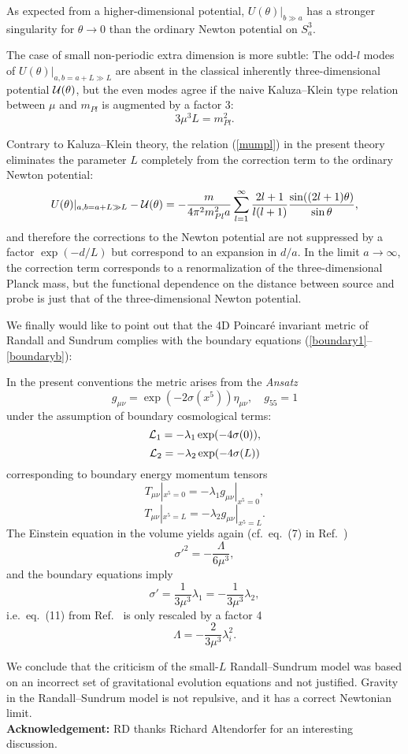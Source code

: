 \documentclass[12pt,fleqn]{article}
\newcommand{\be}{\begin{equation}}
\newcommand{\ee}{\end{equation}}
\begin{document}
As expected from a higher-dimensional potential,  
 $U(\theta)|_{b\gg a}$ has a stronger singularity for $\theta\to 0$ 
than the ordinary Newton potential on $S^3_a$. 

The case of small non-periodic extra dimension is more subtle: 
The odd-$l$ modes of $U(\theta)|_{a,b=a+L\gg L}$ are absent 
in the classical inherently three-dimensional 
potential  ${\cal U}(\theta)$, but the even modes agree 
if the naive Kaluza--Klein type relation between $\mu$
and $m_{Pl}$ is augmented by a factor 3: 
\be\label{mumpl} 
3\mu^3 L=m_{Pl}^2.
\ee

Contrary to Kaluza--Klein theory, the relation (\ref{mumpl}) 
in the present theory
eliminates the parameter $L$ completely from the correction 
term to the ordinary Newton potential:
\be\label{correct}
U(\theta)|_{a,b=a+L\gg L}-{\cal U}(\theta)
=
-\frac{m}{4\pi^2 m_{Pl}^2a}\sum_{l=1}^\infty
\frac{2l+1}{l(l+1)}\frac{\sin((2l+1)\theta)}{\sin\theta},
\ee
and therefore the corrections to the Newton potential are not suppressed
by a factor $\exp(-d/L)$ but correspond to an expansion in $d/a$.
In the limit $a\to\infty$, the correction term
corresponds to a renormalization of the
three-dimensional Planck mass, but the functional dependence
on the distance between source and probe
is just that of the three-dimensional Newton potential.

We finally would like to point out that the 4D Poincar\'{e} invariant
 metric of Randall and Sundrum \cite{RS1} complies with the boundary equations
 (\ref{boundary1}--\ref{boundaryb}):

In the present conventions the metric arises from the {\it Ansatz}
\[
g_{\mu\nu}=\exp(-2\sigma(x^5))\eta_{\mu\nu},\quad g_{55}=1
\]
under the assumption of boundary cosmological terms:
\[
{\cal L}_1=-\lambda_1\exp(-4\sigma(0)),
\]
\[
{\cal L}_2=-\lambda_2\exp(-4\sigma(L))
\]
corresponding to boundary energy momentum tensors
\[
T_{\mu\nu}|_{x^5=0}=-\lambda_1g_{\mu\nu}|_{x^5=0},
\]
\[
T_{\mu\nu}|_{x^5=L}=-\lambda_2g_{\mu\nu}|_{x^5=L}.
\]
The Einstein equation in the volume yields again (cf.\ eq.\ (7) in
Ref.\ \cite{RS1})
\[
{\sigma'}^2=-\frac{\Lambda}{6\mu^3},
\]
and the boundary equations imply
\[
\sigma'=\frac{1}{3\mu^3}\lambda_1=-\frac{1}{3\mu^3}\lambda_2,
\]
i.e.\ eq.\ (11) from Ref.\ \cite{RS1} is only rescaled by a factor 4
\[
\Lambda=-\frac{2}{3\mu^3}\lambda_i^2.
\]

We conclude that the criticism of the small-$L$
Randall--Sundrum model was based on an incorrect set of gravitational
evolution equations and not justified. Gravity in the
Randall--Sundrum model is not repulsive, and it has
a correct Newtonian limit. \\[1ex]
{\bf Acknowledgement:} RD thanks Richard Altendorfer for an
interesting discussion.
\end{document}
